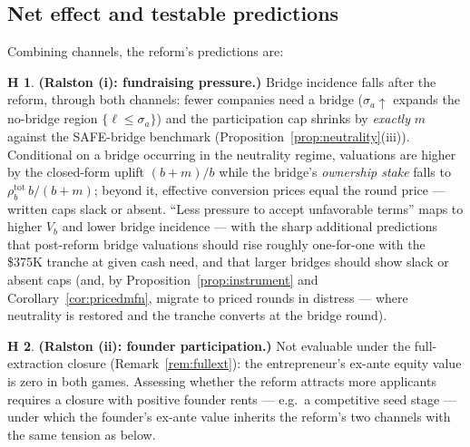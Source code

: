 \documentclass[11pt]{article}
\theoremstyle{definition}
\newtheorem{hypothesis}{H}
\begin{document}
\subsection{Net effect and testable predictions}

Combining channels, the reform's predictions are:

\begin{hypothesis}\label{hyp:pressure}
\textbf{(Ralston (i): fundraising pressure.)} Bridge incidence falls after the reform, through both channels: fewer companies need a bridge ($\sigma_a\uparrow$ expands the no-bridge region $\{\ell\le\sigma_a\}$) and the participation cap shrinks by \emph{exactly} $m$ against the SAFE-bridge benchmark (Proposition~\ref{prop:neutrality}(iii)). Conditional on a bridge occurring in the neutrality regime, valuations are higher by the closed-form uplift $(b+m)/b$ while the bridge's \emph{ownership stake} falls to $\rho_b^{\mathrm{tot}}\,b/(b+m)$; beyond it, effective conversion prices equal the round price --- written caps slack or absent. ``Less pressure to accept unfavorable terms'' maps to higher $V_b$ and lower bridge incidence --- with the sharp additional predictions that post-reform bridge valuations should rise roughly one-for-one with the \$375K tranche at given cash need, and that larger bridges should show slack or absent caps (and, by Proposition~\ref{prop:instrument} and Corollary~\ref{cor:pricedmfn}, migrate to priced rounds in distress --- where neutrality is restored and the tranche converts at the bridge round).
\end{hypothesis}

\begin{hypothesis}\label{hyp:founders}
\textbf{(Ralston (ii): founder participation.)} Not evaluable under the full-extraction closure (Remark~\ref{rem:fullext}): the entrepreneur's ex-ante equity value is zero in both games. Assessing whether the reform attracts more applicants requires a closure with positive founder rents --- e.g.\ a competitive seed stage --- under which the founder's ex-ante value inherits the reform's two channels with the same tension as below.
\end{hypothesis}
\end{document}
